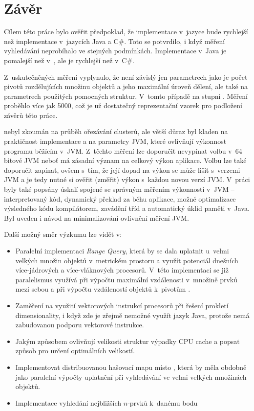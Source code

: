 \chapter{Závěr}

Cílem této práce bylo ověřit předpoklad, že implementace  v~jazyce \CC{} bude rychlejší než implementace v~jazycích Java a C\#.
Toto se potvrdilo, i když měření vyhledávání neprobíhalo ve stejných podmínkách.
Implementace v~Java je pomalejší než v~\CC, ale je rychlejší než v~C\#.

Z~uskutečněných měření vyplynulo, že \MIndex{} není závislý jen parametrech jako je počet pivotů rozdělujících množinu objektů a jeho maximální úroveň dělení, ale také na parametrech použitých pomocných struktur.
V~tomto případě na stupni \BPTree.
Měření proběhlo více jak 5000, což je už dostatečný reprezentační vzorek pro podložení závěrů této práce.

\MIndex{} nebyl zkoumán na průběh ořezávání clusterů, ale větší důraz byl kladen na praktičnost implementace a na parametry JVM, které ovlivňují výkonnost programu běžícím v~JVM.
Z~těchto měření lze doporučit nevypínat volbu  v~64 bitové JVM neboť má zásadní význam na celkový výkon aplikace.
Volbu  lze také doporučit zapínat, ovšem s~tím, že její dopad na výkon se může lišit s~verzemi JVM a je tedy nutné si ověřit (změřit) výkon s~každou novou verzí JVM.
V~práci byly také popsány úskalí spojené se správným měřením výkonnosti v~JVM -- interpretovaný kód, dynamický překlad \bytecode{} za běhu aplikace, možné optimalizace výsledného kódu kompilátorem, zavádění tříd a automatický úklid paměti v~Java.
Byl uveden i návod na minimalizování ovlivnění měření  JVM.

Další možný směr výzkumu  lze vidět v:
\begin{itemize}
\item Paralelní implementaci \emph{Range Query}, která by se dala uplatnit u~velmi velkých množin objektů v~metrickém prostoru a využít potenciál dnešních více-jádrových a více-vláknových procesorů. V~této implementaci se již paralelismus využívá při výpočtu maximální vzdálenosti v~množině prvků mezi sebou a při výpočtu vzdáleností objektů k~pivotům .
\item Zaměření na využití vektorových instrukcí procesorů při řešení prokletí dimensionality, i když zde je zřejmě nemožné využít jazyk Java, protože nemá zabudovanou podporu vektorové instrukce.
\item Jakým způsobem ovlivňují velikosti struktur výpadky CPU cache a popsat způsob pro určení optimálních velikostí.
\item Implementovat distribuovanou hašovací mapu místo \BPTree{}, která by měla obdobně jako paralelní výpočty uplatnění při vyhledávání ve velmi velkých množinách objektů.
\item Implementace vyhledání nejbližších $n$-prvků k~danému bodu
 \end{itemize}
 
